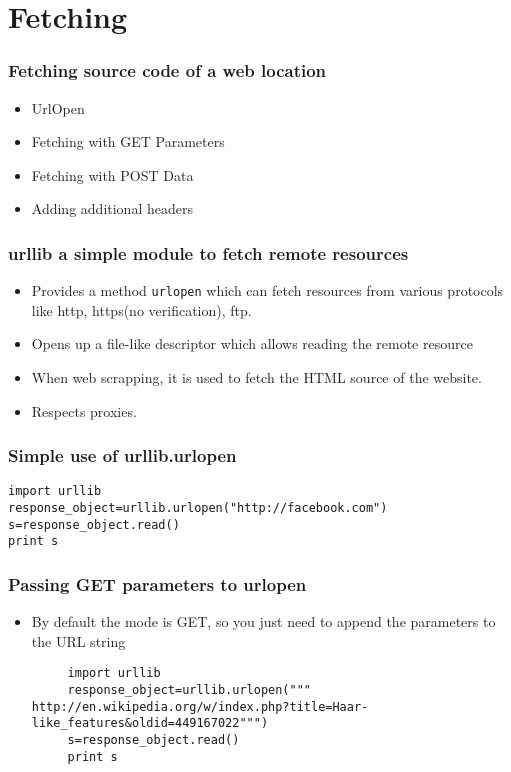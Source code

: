 \documentclass{beamer}
\begin{document}
\section{Fetching}
\label{sec-3}
\begin{frame}
\frametitle{Fetching source code of a web location}
\label{sec-3_1}


\begin{itemize}
\item UrlOpen
\item Fetching with GET Parameters
\item Fetching with POST Data
\item Adding additional headers
\end{itemize}
\end{frame}
\begin{frame}
\frametitle{urllib a simple module to fetch remote resources}
\label{sec-3_2}


\begin{itemize}
\item Provides a method \texttt{urlopen} which can fetch resources from various protocols like http, https(no verification), ftp.
\item Opens up a file-like descriptor which allows reading the remote resource
\item When web scrapping, it is used to fetch the HTML source of the website.
\item Respects proxies.
\end{itemize}
\end{frame}
\begin{frame}[fragile]
\frametitle{Simple use of urllib.urlopen}
\label{sec-3_3}

\begin{verbatim}
import urllib
response_object=urllib.urlopen("http://facebook.com")
s=response_object.read()
print s
\end{verbatim}
\end{frame}
\begin{frame}[fragile]
\frametitle{Passing GET parameters to urlopen}
\label{sec-3_4}


\begin{itemize}
\item By default the mode is GET, so you just need to append the parameters to the URL string
     
\begin{verbatim}
     import urllib
     response_object=urllib.urlopen("""
http://en.wikipedia.org/w/index.php?title=Haar-like_features&oldid=449167022""")
     s=response_object.read()
     print s
\end{verbatim}
\end{itemize}
\end{frame}
\end{document}
